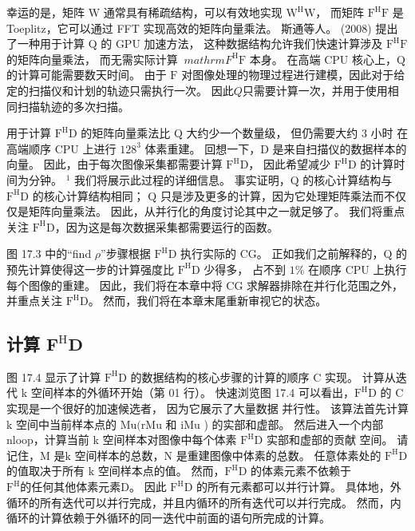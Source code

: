 幸运的是，矩阵 $\mathrm{W}$ 通常具有稀疏结构，可以有效地实现 $\mathrm{W}^{\mathrm{H}} \mathrm{W}$，
而矩阵 $\mathrm{F }^{\mathrm{H}} \mathrm{F}$ 是 Toeplitz，它可以通过 FFT 实现高效的矩阵向量乘法。 
斯通等人。 (2008) 提出了一种用于计算 Q 的 GPU 加速方法，
这种数据结构允许我们快速计算涉及 $\mathrm{F}^{\mathrm{H}} \mathrm{F}$ 的矩阵向量乘法，
而无需实际计算 $\ mathrm{F}^{\mathrm{H}} \mathrm{F}$ 本身。 
在高端 CPU 核心上，$\mathrm{Q}$ 的计算可能需要数天时间。 
由于 $\mathrm{F}$ 对图像处理的物理过程进行建模，因此对于给定的扫描仪和计划的轨迹只需执行一次。 
因此$Q$只需要计算一次，并用于使用相同扫描轨迹的多次扫描。

用于计算 $\mathrm{F}^{\mathrm{H}} \mathrm{D}$ 的矩阵向量乘法比 $\mathrm{Q}$ 大约少一个数量级，
但仍需要大约 3 小时 在高端顺序 CPU 上进行 $128^{3}$ 体素重建。 回想一下，D 是来自扫描仪的数据样本的向量。 
因此，由于每次图像采集都需要计算 $\mathrm{F}^{\mathrm{H}} \mathrm{D}$，
因此希望减少 $\mathrm{F}^{\mathrm{H}} \mathrm{D}$ 的计算时间为分钟。 ${ }^{1}$ 我们将展示此过程的详细信息。 
事实证明，$\mathrm{Q}$ 的核心计算结构与 $\mathrm{F}^{\mathrm{H}}\mathrm{D}$ 的核心计算结构相同； 
$\mathrm{Q}$ 只是涉及更多的计算，因为它处理矩阵乘法而不仅仅是矩阵向量乘法。 因此，从并行化的角度讨论其中之一就足够了。 
我们将重点关注 $\mathrm{F}^{\mathrm{H}} \mathrm{D}$，因为这是每次数据采集都需要运行的函数。

图 17.3 中的“find $\rho$”步骤根据 $\mathrm{F}^{\mathrm{H}} \mathrm{D}$ 执行实际的 CG。 
正如我们之前解释的，$\mathrm{Q}$ 的预先计算使得这一步的计算强度比 $\mathrm{F}^{\mathrm{H}} \mathrm{D}$ 少得多，
占不到 $1 \% $ 在顺序 CPU 上执行每个图像的重建。 
因此，我们将在本章中将 CG 求解器排除在并行化范围之外，并重点关注 $\mathrm{F}^{\mathrm{H}} \mathrm{D}$。 
然而，我们将在本章末尾重新审视它的状态。

\subsection{计算 $\mathbf{F}^{\mathrm{H}} \mathbf{D}$}
图 17.4 显示了计算 $\mathrm{F}^{\mathrm{H}} \mathrm{D}$ 的数据结构的核心步骤的计算的顺序 $\mathrm{C}$ 实现。 
计算从迭代 k 空间样本的外循环开始（第 01 行）。 
快速浏览图 17.4 可以看出，$\mathrm{F}^{\mathrm{H}} \mathrm{D}$ 的 $\mathrm{C}$ 实现是一个很好的加速候选者，
因为它展示了大量数据 并行性。 
该算法首先计算 k 空间中当前样本点的 $\mathrm{Mu}(\mathrm{rMu}$ 和 $\mathrm{iMu}$ ) 的实部和虚部。 
然后进入一个内部 nloop，计算当前 k 空间样本对图像中每个体素 $\mathrm{F}^{\mathrm{H}} \mathrm{D}$ 实部和虚部的贡献 空间。 
请记住，$\mathrm{M}$ 是$\mathrm{k}$ 空间样本的总数，$\mathrm{N}$ 是重建图像中体素的总数。 
任意体素处的 $\mathrm{F}^{\mathrm{H}} \mathrm{D}$ 的值取决于所有 $\mathrm{k}$ 空间样本点的值。 
然而，$\mathrm{F}^{\mathrm{H}} \mathrm{D}$ 的体素元素不依赖于 
$\mathrm{F}^{\mathrm{H}} \mathrm{ 的任何其他体素元素 D}$。 
因此 $\mathrm{F}^{\mathrm{H}} \mathrm{D}$ 的所有元素都可以并行计算。 
具体地，外循环的所有迭代可以并行完成，并且内循环的所有迭代可以并行完成。 
然而，内循环的计算依赖于外循环的同一迭代中前面的语句所完成的计算。

